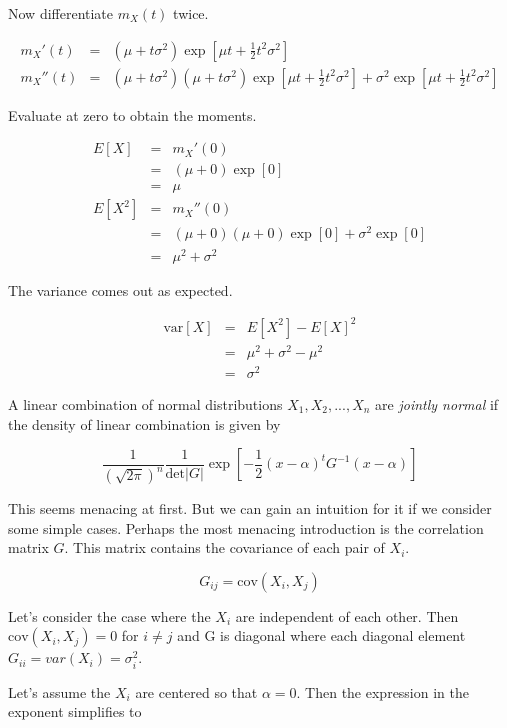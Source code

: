 \documentclass[]{article}
\begin{document}
Now differentiate $m_X(t)$ twice.

\begin{eqnarray*}
m_X'(t) &= &(\mu + t\sigma^2) \exp \left[ \mu t + \frac{1}{2} t^2 \sigma^2 \right] \\
m_X''(t) &= &(\mu + t\sigma^2) (\mu + t\sigma^2) 
   \exp \left[ \mu t + \frac{1}{2} t^2 \sigma^2 \right]
   + \sigma^2 \exp \left[ \mu t + \frac{1}{2} t^2 \sigma^2 \right]
\end{eqnarray*}

Evaluate at zero to obtain the moments.

\begin{eqnarray*}
E[X] &= &m_X'(0) \\
   &= &(\mu + 0) \exp [0] \\
   &= &\mu \\
E[X^2] &= &m_X''(0) \\
   &= &(\mu + 0) (\mu + 0) \exp[ 0] + \sigma^2 \exp [0] \\
   &= &\mu^2 + \sigma^2
\end{eqnarray*}

The variance comes out as expected.

\begin{eqnarray*}
\mbox{var}[X] &= &E[X^2] - E[X]^2 \\
  &= &\mu^2 + \sigma^2 - \mu^2 \\
  &= &\sigma^2
\end{eqnarray*}


A linear combination of normal distributions
$X_1, X_2, ..., X_n$ are \emph{jointly normal}
if the density of linear combination is given by

$$
\frac{1}{(\sqrt{2\pi})^n} \frac{1}{\mbox{det}|G|} \exp
\left[ -\frac{1}{2}(x-\alpha)^t G^{-1} (x-\alpha) \right]
$$

This seems menacing at first.  But we can gain an
intuition for it if we consider some simple cases.
Perhaps the most menacing introduction is the
correlation matrix $G$.  This matrix contains the covariance
of each pair of $X_i$.

$$
G_{ij} = \mbox{cov}(X_i, X_j)
$$

Let's consider the case where the $X_i$ are independent of
each other.  Then $\mbox{cov}(X_i, X_j) = 0$ for $i \ne j$
and G is diagonal where each diagonal element
$G_{ii} = var(X_i) = \sigma_i^2$.

Let's assume the $X_i$ are centered so that $\alpha = 0$.
Then the expression in the exponent simplifies to
\end{document}
